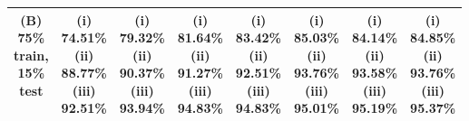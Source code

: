 \documentclass{style1}
\begin{document}
\begin{center}
\begin{tabular}{|c|c  |c  |c  |c  |c  |c  |c |}
\makecell{(B)\\75\%\\train,\\15\%\\test} &
\makecell{(i)\\74.51\%\\(ii)\\88.77\%\\(iii)\\92.51\%} &
\makecell{(i)\\79.32\%\\(ii)\\90.37\%\\(iii)\\93.94\%} &
\makecell{(i)\\81.64\%\\(ii)\\91.27\%\\(iii)\\94.83\%} &
\makecell{(i)\\83.42\%\\(ii)\\92.51\%\\(iii)\\94.83\%} &
\makecell{(i)\\85.03\%\\(ii)\\93.76\%\\(iii)\\95.01\%} &
\makecell{(i)\\84.14\%\\(ii)\\93.58\%\\(iii)\\95.19\%} &
\makecell{(i)\\84.85\%\\(ii)\\93.76\%\\(iii)\\95.37\%} \\ \hline 


\end{tabular}
\end{center}
\end{document}
